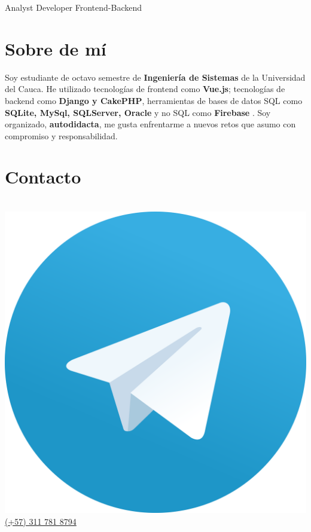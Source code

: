 \documentclass[american]{cv-class}
\begin{document}
{Analyst Developer Frontend-Backend}

\vspace{1.15cm}



\begin{aside}


    \vspace{3.2cm}
    
    \section{Sobre de mí}
    \justifying
    \begin{small}
    	{ Soy estudiante de octavo semestre de \textbf{Ingeniería de Sistemas} de la
     Universidad del Cauca. He utilizado tecnologías de frontend como \textbf{Vue.js}; tecnologías de backend como \textbf{Django y CakePHP}, herramientas de bases de datos SQL como \textbf{SQLite, MySql, SQLServer, Oracle} y no SQL como \textbf{Firebase} . Soy organizado, \textbf{autodidacta}, me gusta enfrentarme a nuevos retos que asumo con compromiso y responsabilidad.
    	}
    \end{small}

    
	\section{Contacto}
	\\
	\href{https://msng.link/o/?dawish7=tg}{\raisebox{-0.35ex}
	{\includegraphics[scale=0.0023]{img/telegram-logo.png}} (+57) 311 781 8794}
    

\end{aside}
\end{document}
